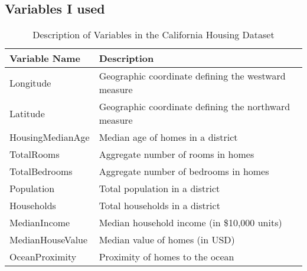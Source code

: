 \documentclass[12pt]{article}
\begin{document}
\subsection{Variables I used}
\begin{table}[ht]
	\centering
	\begin{tabular}{ll}
		\toprule
		\textbf{Variable Name} & \textbf{Description} \\
		\midrule
		Longitude & Geographic coordinate defining the westward measure \\
		Latitude & Geographic coordinate defining the northward measure \\
		HousingMedianAge & Median age of homes in a district \\
		TotalRooms & Aggregate number of rooms in homes \\
		TotalBedrooms & Aggregate number of bedrooms in homes \\
		Population & Total population in a district \\
		Households & Total households in a district \\
		MedianIncome & Median household income (in \$10,000 units) \\
		MedianHouseValue & Median value of homes (in USD) \\
		OceanProximity & Proximity of homes to the ocean \\
		\bottomrule
	\end{tabular}
	\caption{Description of Variables in the California Housing Dataset}
	\label{tab:variables}
\end{table}
	


\end{document}
